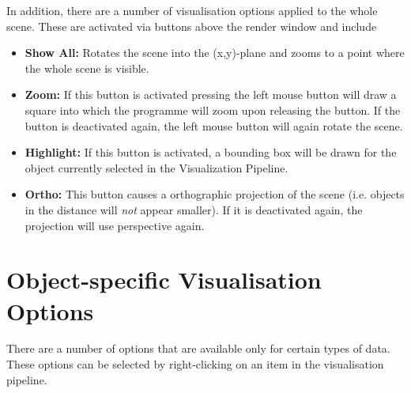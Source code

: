 In addition, there are a number of visualisation options applied to the whole scene. These are activated via buttons above the render window and include

\begin{itemize}
\item \textbf{Show All:} Rotates the scene into the (x,y)-plane and zooms to a point where the whole scene is visible.
\item \textbf{Zoom:} If this button is activated pressing the left mouse button will draw a square into which the programme will zoom upon releasing the button. If the button is deactivated again, the left mouse button will again rotate the scene.
\item \textbf{Highlight:} If this button is activated, a bounding box will be drawn for the object currently selected in the Visualization Pipeline.
\item \textbf{Ortho:} This button causes a orthographic projection of the scene (i.e. objects in the distance will \emph{not} appear smaller). If it is deactivated again, the projection will use perspective again.
\end{itemize}


\section{Object-specific Visualisation Options}
\label{specvisoptions}

There are a number of options that are available only for certain types of data. These options can be selected by right-clicking on an item in the visualisation pipeline.


